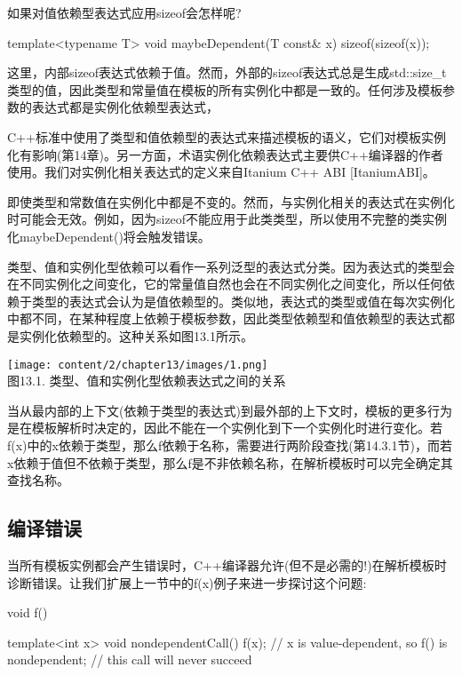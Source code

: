 如果对值依赖型表达式应用sizeof会怎样呢?

\begin{cpp}
template<typename T> void maybeDependent(T const& x)
{
	sizeof(sizeof(x));
}
\end{cpp}

这里，内部sizeof表达式依赖于值。然而，外部的sizeof表达式总是生成std::size\_t类型的值，因此类型和常量值在模板的所有实例化中都是一致的。任何涉及模板参数的表达式都是实例化依赖型表达式，

\begin{notice}C++标准中使用了类型和值依赖型的表达式来描述模板的语义，它们对模板实例化有影响(第14章)。另一方面，术语实例化依赖表达式主要供C++编译器的作者使用。我们对实例化相关表达式的定义来自Itanium C++ ABI [ItaniumABI]。
\end{notice}

即使类型和常数值在实例化中都是不变的。然而，与实例化相关的表达式在实例化时可能会无效。例如，因为sizeof不能应用于此类类型，所以使用不完整的类实例化maybeDependent()将会触发错误。

类型、值和实例化型依赖可以看作一系列泛型的表达式分类。因为表达式的类型会在不同实例化之间变化，它的常量值自然也会在不同实例化之间变化，所以任何依赖于类型的表达式会认为是值依赖型的。类似地，表达式的类型或值在每次实例化中都不同，在某种程度上依赖于模板参数，因此类型依赖型和值依赖型的表达式都是实例化依赖型的。这种关系如图13.1所示。

\begin{center}
\texttt{[image: content/2/chapter13/images/1.png]} \\
图13.1. 类型、值和实例化型依赖表达式之间的关系
\end{center}

当从最内部的上下文(依赖于类型的表达式)到最外部的上下文时，模板的更多行为是在模板解析时决定的，因此不能在一个实例化到下一个实例化时进行变化。若f(x)中的x依赖于类型，那么f依赖于名称，需要进行两阶段查找(第14.3.1节)，而若x依赖于值但不依赖于类型，那么f是不非依赖名称，在解析模板时可以完全确定其查找名称。

\subsection{编译错误}

当所有模板实例都会产生错误时，C++编译器允许(但不是必需的!)在解析模板时诊断错误。让我们扩展上一节中的f(x)例子来进一步探讨这个问题:

\begin{cpp}
void f() { }

template<int x> void nondependentCall()
{
	f(x); // x is value-dependent, so f() is nondependent;
	// this call will never succeed
}
\end{cpp}

